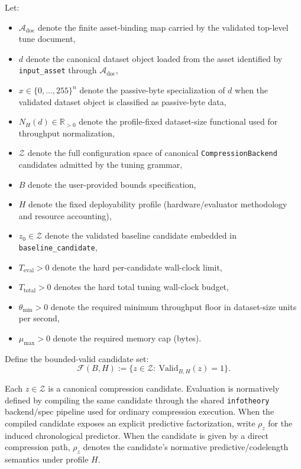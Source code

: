 \documentclass[11pt]{article}
\begin{document}
Let:
\begin{itemize}
    \item $\mathcal{A}_{\mathrm{doc}}$ denote the finite asset-binding map
    carried by the validated top-level tune document,
    \item $d$ denote the canonical dataset object loaded from the asset
    identified by \texttt{input\_asset} through
    $\mathcal{A}_{\mathrm{doc}}$,
    \item $x \in \{0,\dots,255\}^{n}$ denote the passive-byte specialization
    of $d$ when the validated dataset object is classified as passive-byte
    data,
    \item $N_H(d)\in\mathbb{R}_{>0}$ denote the profile-fixed dataset-size
    functional used for throughput normalization,
    \item $\mathcal{Z}$ denote the full configuration space of canonical
    \texttt{CompressionBackend} candidates admitted by the tuning grammar,
    \item $B$ denote the user-provided bounds specification,
    \item $H$ denote the fixed deployability profile (hardware/evaluator methodology and resource accounting),
    \item $z_0 \in \mathcal{Z}$ denote the validated baseline candidate
    embedded in \texttt{baseline\_candidate},
    \item $T_{\mathrm{eval}} > 0$ denote the hard per-candidate wall-clock limit,
    \item $T_{\mathrm{total}} > 0$ denotes the hard total tuning wall-clock budget,
    \item $\theta_{\min}>0$ denote the required minimum throughput floor in
    dataset-size units per second,
    \item $\mu_{\max}>0$ denote the required memory cap (bytes).
\end{itemize}

Define the bounded-valid candidate set:
\[
\mathcal{F}(B,H):=\{z \in \mathcal{Z}:\ \mathrm{Valid}_{B,H}(z)=1\}.
\]

Each $z\in\mathcal{Z}$ is a canonical compression candidate. Evaluation is
normatively defined by compiling the same candidate through the shared
\texttt{infotheory} backend/spec pipeline used for ordinary compression
execution. When the compiled candidate exposes an explicit predictive
factorization, write $\rho_z$ for the induced chronological predictor. When the
candidate is given by a direct compression path, $\rho_z$ denotes the
candidate's normative predictive/codelength semantics under profile $H$.
\end{document}
